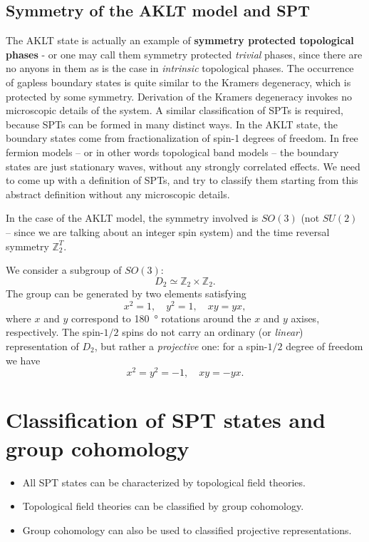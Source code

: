 \documentclass[hyperref, a4paper]{article}
\newcommand*{\concept}[1]{{\textbf{#1}}}
\begin{document}
\subsection{Symmetry of the AKLT model and SPT}

The AKLT state is actually an example of \concept{symmetry protected topological phases} - or one may call them symmetry protected \emph{trivial} phases, since there are no anyons in them as is the case in \emph{intrinsic} topological phases. 
The occurrence of gapless boundary states is quite similar to the Kramers degeneracy, which is protected by some symmetry.
Derivation of the Kramers degeneracy invokes no microscopic details of the system. 
A similar classification of SPTs is required, because SPTs can be formed in many distinct ways.
In the AKLT state, the boundary states come from fractionalization of spin-1 degrees of freedom.
In free fermion models -- or in other words topological band models -- the boundary states are just 
stationary waves, without any strongly correlated effects. We need to come up with a definition of SPTs, and try to classify them starting 
from this abstract definition without any microscopic details.

In the case of the AKLT model, the symmetry involved is $SO(3)$ (not $SU(2)$ -- since we are talking about 
an integer spin system) and the time reversal symmetry $\mathbb{Z}_2^T$. 

We consider a subgroup of $SO(3)$:
\begin{equation}
    D_2 \simeq \mathbb{Z}_2 \times \mathbb{Z}_2.
\end{equation}
The group can be generated by two elements satisfying
\begin{equation}
    x^2 = 1, \quad y^2 = 1, \quad xy = yx,
\end{equation}
where $x$ and $y$ correspond to \SI{180}{\degree} rotations around the $x$ and $y$ axises, respectively.
The spin-$1/2$ spins do not carry an ordinary (or \emph{linear}) representation of $D_2$, but rather a \emph{projective} one: for a spin-$1/2$ degree of freedom we have 
\begin{equation}
    x^2 = y^2 = -1, \quad xy = - yx.
\end{equation}

\section{Classification of SPT states and group cohomology}

\begin{itemize}
    \item All SPT states can be characterized by topological field theories.
    \item Topological field theories can be classified by group cohomology.
    \item Group cohomology can also be used to classified projective representations.
\end{itemize}
\end{document}
